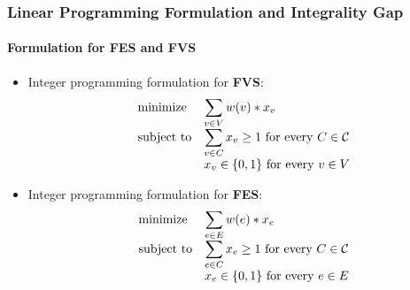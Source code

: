 \documentclass[10pt]{beamer}
\begin{document}
\begin{frame}
    \frametitle{Linear Programming Formulation and Integrality Gap}
    \framesubtitle{Formulation for FES and FVS}
    \begin{itemize}
        \item Integer programming formulation for \textbf{FVS}:
        \begin{equation*}
            \begin{array}{ll@{}ll}
                \text{minimize}  & \displaystyle\sum_{v\in V} w(v) * x_v \\
                \text{subject to}& \displaystyle\sum_{v\in C} x_v \geq 1  \text{ for every } C \in \mathcal{C}\\
                                    & x_v \in \{0, 1\} \text{ for every } v \in V\\
            \end{array}
        \end{equation*}

        \item Integer programming formulation for \textbf{FES}:
        \begin{equation*}
            \begin{array}{ll@{}ll}
                \text{minimize}  & \displaystyle\sum_{e\in E} w(e) * x_e \\
                \text{subject to}& \displaystyle\sum_{e\in C} x_e \geq 1  \text{ for every } C \in \mathcal{C}\\
                                    & x_e \in \{0, 1\} \text{ for every } e \in E\\
            \end{array}
        \end{equation*}
\end{itemize}
\end{frame}
    
\end{document}
